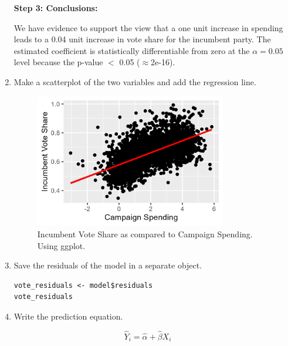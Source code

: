\documentclass[12pt,letterpaper]{article}
\begin{document}
\begin{enumerate}
\begin{verbatim}
		\end{verbatim}
		
\textbf{Step 3: Conclusions:}
		
		We have evidence to support the view that a one unit increase in spending leads to a 0.04 unit increase in vote share for the incumbent party. The estimated coefficient is statistically differentiable from zero at the $\alpha=0.05$ level because the p-value $<$ 0.05 ($\approx $2e-16).
		

\newpage
		
		\item Make a scatterplot of the two variables and add the regression line. 	
		
		  
		
\begin{figure}[h!]
			
	\centering
	\caption{\footnotesize Incumbent Vote Share as compared to Campaign Spending. Using ggplot.}
	\includegraphics[width=0.79\textwidth]{vote_share_incumbent_scatter.png}
	
\end{figure}

		
		
		
		\item Save the residuals of the model in a separate object.	
		
			\begin{verbatim}
vote_residuals <- model$residuals
vote_residuals
		\end{verbatim}
		
		\item Write the prediction equation.
			\end{enumerate}		
{\large 			$$\hat{Y}_i = \hat{\alpha} +  \hat{\beta}X_i $$}
\end{document}
